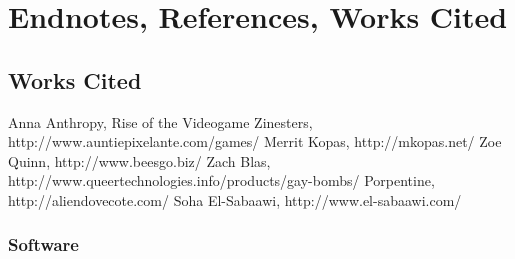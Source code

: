 
\chapter{Endnotes, References, Works Cited} %

\label{Chapter7} %



\section{Works Cited}


Anna Anthropy, Rise of the Videogame Zinesters, http://www.auntiepixelante.com/games/
Merrit Kopas, http://mkopas.net/
Zoe Quinn, http://www.beesgo.biz/
Zach Blas, http://www.queertechnologies.info/products/gay-bombs/
Porpentine, http://aliendovecote.com/
Soha El-Sabaawi, http://www.el-sabaawi.com/

\subsection{Software}
